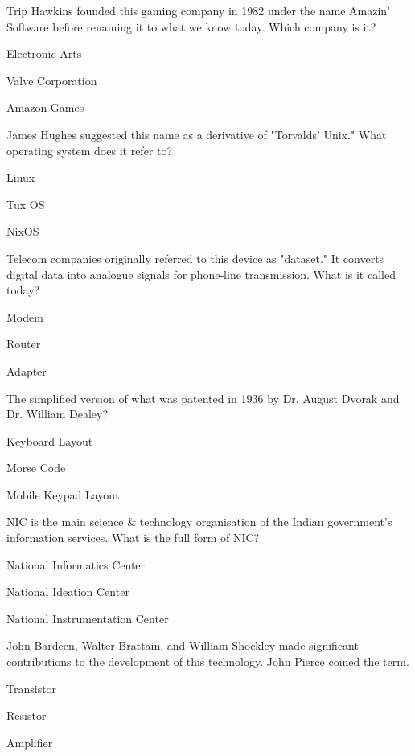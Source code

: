 \begin{enhancedmcq}{Trip Hawkins founded this gaming company in 1982 under the name Amazin' Software before renaming it to what we know today. Which company is it?}
\item Electronic Arts
\item Valve Corporation
\item Amazon Games

\end{enhancedmcq}
\begin{enhancedmcq}{James Hughes suggested this name as a derivative of "Torvalds' Unix." What operating system does it refer to?}
\item Linux
\item Tux OS
\item NixOS

\end{enhancedmcq}
\begin{enhancedmcq}{Telecom companies originally referred to this device as "dataset." It converts digital data into analogue signals for phone‑line transmission. What is it called today?}
\item Modem
\item Router
\item Adapter

\end{enhancedmcq}
\begin{enhancedmcq}{The simplified version of what was patented in 1936 by Dr. August Dvorak and Dr. William Dealey?}
\item Keyboard Layout
\item Morse Code
\item Mobile Keypad Layout

\end{enhancedmcq}
\begin{enhancedmcq}{NIC is the main science & technology organisation of the Indian government's information services. What is the full form of NIC?}
\item National Informatics Center
\item National Ideation Center
\item National Instrumentation Center

\end{enhancedmcq}
\begin{enhancedmcq}{John Bardeen, Walter Brattain, and William Shockley made significant contributions to the development of this technology. John Pierce coined the term.}
\item Transistor
\item Resistor
\item Amplifier

\end{enhancedmcq}
